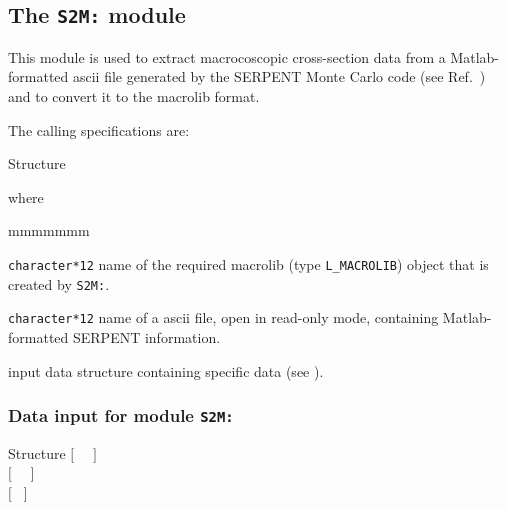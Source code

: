\subsection{The {\tt S2M:} module}\label{sect:S2MData}

This module is used to extract macrocoscopic cross-section data from a Matlab-formatted {\sc ascii} file
generated by the SERPENT Monte Carlo code (see Ref.~) and to convert it to the {\sc macrolib} format.

\vskip 0.02cm

The calling specifications are:

\begin{DataStructure}{Structure }
~\moc{:=}~~~\moc{::}~ \\
\end{DataStructure}

\noindent where
\begin{ListeDeDescription}{mmmmmmm}

\item[\dusa{MACRO}] {\tt character*12} name of the required {\sc macrolib} (type {\tt L\_MACROLIB}) object that is created by {\tt S2M:}.

\item[\dusa{matlab.m}] {\tt character*12} name of a {\sc ascii} file, open in read-only mode, containing Matlab-formatted SERPENT information.

\item[\dusa{S2M\_data}] input data structure containing specific data (see ).

\end{ListeDeDescription}

\subsubsection{Data input for module {\tt S2M:}}\label{sect:descS2M}

\vskip -0.5cm

\begin{DataStructure}{Structure }
$[$~ ~$]$ \\
$[$~ ~$]$ \\
$[$~ $]$ \\
\moc{;}
\end{DataStructure}

